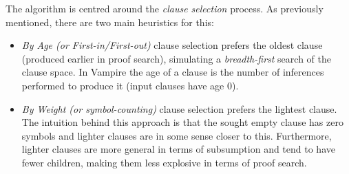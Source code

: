 \documentclass{llncs}
\begin{document}
The algorithm is centred around the \emph{clause selection} process. As previously mentioned, there are two main heuristics for this:
\begin{itemize}
	\item \emph{By Age (or First-in/First-out)} clause selection prefers the oldest clause (produced earlier in proof search), simulating a \emph{breadth-first} search of the clause space. In Vampire the age of a clause is the number of inferences performed to produce it (input clauses have age 0).
	\item \emph{By Weight (or symbol-counting)} clause selection prefers the lightest clause. The intuition behind this approach is that the sought empty clause has zero symbols and lighter clauses are in some sense closer to this. Furthermore, lighter clauses are more general in terms of subsumption and tend to have fewer children, making them less explosive in terms of proof search.
\end{itemize}
\end{document}
